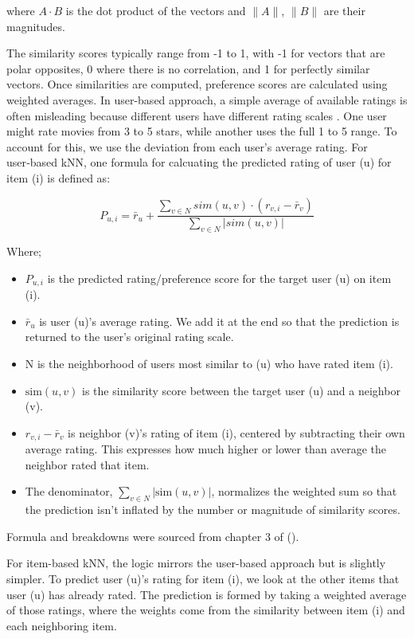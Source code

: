 \documentclass[
  12pt]{article}
\begin{document}
where \(A \cdot B\) is the dot product of the vectors and \(\|A\|\),
\(\|B\|\) are their magnitudes.

The similarity scores typically range from -1 to 1, with -1 for vectors
that are polar opposites, 0 where there is no correlation, and 1 for
perfectly similar vectors. Once similarities are computed, preference
scores are calculated using weighted averages. In user-based approach, a
simple average of available ratings is often misleading because
different users have different rating scales \citep{apxml2025}. One user
might rate movies from 3 to 5 stars, while another uses the full 1 to 5
range. To account for this, we use the deviation from each user's
average rating. For user‑based kNN, one formula for calcuating the
predicted rating of user (u) for item (i) is defined as:

\[
P_{u,i} = \bar{r}_u + \frac{\sum_{v \in N} sim(u,v) \cdot (r_{v,i} - \bar{r}_v)}{\sum_{v \in N} |sim(u,v)|}
\]

Where;

\begin{itemize}
\item
  \(P_{u,i}\) is the predicted rating/preference score for the target
  user (u) on item (i).
\item
  \(\bar{r}_u\) is user (u)'s average rating. We add it at the end so
  that the prediction is returned to the user's original rating scale.
\item
  N is the neighborhood of users most similar to (u) who have rated item
  (i).
\item
  \(\text{sim}(u,v)\) is the similarity score between the target user
  (u) and a neighbor (v).
\item
  \(r_{v,i} - \bar{r}_v\) is neighbor (v)'s rating of item (i), centered
  by subtracting their own average rating. This expresses how much
  higher or lower than average the neighbor rated that item.
\item
  The denominator, \(\sum_{v \in N} |\text{sim}(u,v)|\), normalizes the
  weighted sum so that the prediction isn't inflated by the number or
  magnitude of similarity scores.
\end{itemize}

Formula and breakdowns were sourced from chapter 3 of
(\citet{apxml2025}).

For item-based kNN, the logic mirrors the user-based approach but is
slightly simpler. To predict user (u)'s rating for item (i), we look at
the other items that user (u) has already rated. The prediction is
formed by taking a weighted average of those ratings, where the weights
come from the similarity between item (i) and each neighboring item.
\end{document}
